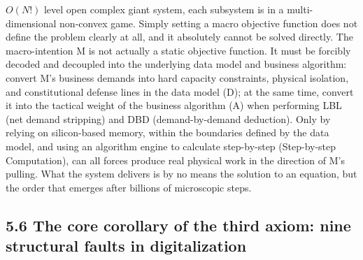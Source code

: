 \documentclass[11pt,a4paper]{article}
\begin{document}
$O(N!)$ level open complex giant system, each subsystem is in a multi-dimensional non-convex game. Simply setting a macro objective function does not define the problem clearly at all, and it absolutely cannot be solved directly. The macro-intention M is not actually a static objective function. It must be forcibly decoded and decoupled into the underlying data model and business algorithm: convert M's business demands into hard capacity constraints, physical isolation, and constitutional defense lines in the data model (D); at the same time, convert it into the tactical weight of the business algorithm (A) when performing LBL (net demand stripping) and DBD (demand-by-demand deduction). Only by relying on silicon-based memory, within the boundaries defined by the data model, and using an algorithm engine to calculate step-by-step (Step-by-step Computation), can all forces produce real physical work in the direction of M's pulling. What the system delivers is by no means the solution to an equation, but the order that emerges after billions of microscopic steps.


\subsection*{5.6 The core corollary of the third axiom: nine structural faults in digitalization}
\end{document}
